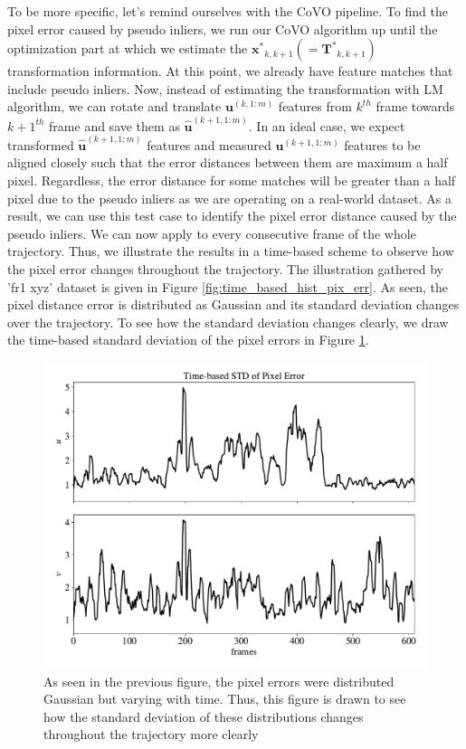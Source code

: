 \documentclass[a4paper]{report}
\numberwithin{figure}{section}
\begin{document}
To be more specific, let's remind ourselves with the CoVO pipeline.  To find 
the pixel error caused by pseudo inliers, we run our CoVO algorithm up until 
the optimization part at which we estimate the 
$\mathbf{x^*}_{k,k+1}(=\mathbf{T^*}_{k,k+1})$ transformation information.  At 
this point, we already have feature matches that include pseudo inliers.  Now, 
instead of estimating the transformation with LM algorithm, we can rotate 
and translate $\mathbf{u}^{(k,1:m)}$ features from $k^{th}$ frame towards 
$k+1^{th}$ frame and save them as $\mathbf{\hat{u}}^{(k+1,1:m)}$.  In an ideal 
case, we expect transformed $\mathbf{\hat{u}}^{(k+1,1:m)}$ features and 
measured $\mathbf{u}^{(k+1,1:m)}$ features to be aligned closely such that the 
error distances between them are maximum a half pixel.  Regardless, the error 
distance for some matches will be greater than a half pixel due to the pseudo 
inliers as we are operating on a real-world dataset.  As a result, we can use 
this test case to identify the pixel error distance caused by the pseudo 
inliers.  We can now apply to every consecutive frame of the whole 
trajectory.  Thus, we illustrate the results in a time-based scheme to observe 
how the pixel error changes throughout the trajectory. The illustration 
gathered by 'fr1 xyz' dataset is given in Figure 
\ref{fig:time_based_hist_pix_err}.  As seen, the pixel distance error is 
distributed as Gaussian and its standard deviation changes over the 
trajectory.  To see how the standard deviation changes clearly, we draw the 
time-based standard deviation of the pixel errors in Figure 
\ref{fig:time_based_std_pix_err}.


\begin{figure}[H] \centering 
\includegraphics[width=0.8\linewidth,natwidth=640,natheight=640] 
{fig/eva_graphs/tum_fr1_xyz_tbased_uv_err_std.pdf} \caption[The Standard 
Deviations of Pixel Errors] {As seen in the previous figure, the pixel errors 
were distributed Gaussian but varying with time. Thus, this figure is drawn to 
see how the standard deviation of these distributions changes throughout the 
trajectory more clearly }\label{fig:time_based_std_pix_err} \end{figure}
\end{document}
